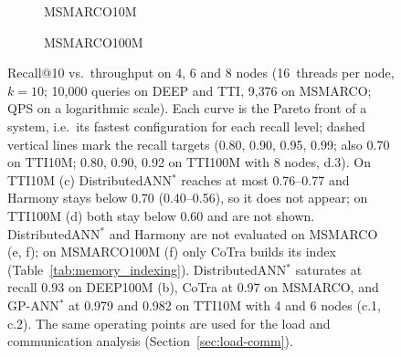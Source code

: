 \begin{figure}[t]
\begin{subfigure}[t]{0.495\textwidth}
  \hfill{}\hfill{}
  \caption{MSMARCO10M}\label{fig:curve-msmarco10m}
\end{subfigure}\hfill
\begin{subfigure}[t]{0.495\textwidth}
  \hfill{}\hfill{}
  \caption{MSMARCO100M}\label{fig:curve-msmarco100m}
\end{subfigure}
\caption{Recall@10 vs.\ throughput on 4, 6 and 8 nodes (16~threads per node, $k{=}10$;
10{,}000 queries on DEEP and TTI, 9{,}376 on MSMARCO; QPS on a logarithmic scale). Each
curve is the Pareto front of a system, i.e.\ its fastest configuration for each recall
level; dashed vertical lines mark the recall targets (0.80, 0.90, 0.95, 0.99; also 0.70 on
TTI10M; 0.80, 0.90, 0.92 on TTI100M with 8 nodes, d.3). On TTI10M (c) DistributedANN$^*$
reaches at most 0.76--0.77 and Harmony stays below 0.70 (0.40--0.56), so it does not appear;
on TTI100M (d) both stay below 0.60 and are not shown. DistributedANN$^*$ and Harmony are
not evaluated on MSMARCO (e, f); on MSMARCO100M (f) only CoTra builds its index
(Table~\ref{tab:memory_indexing}). DistributedANN$^*$ saturates at recall 0.93 on DEEP100M (b),
CoTra at 0.97 on MSMARCO, and GP-ANN$^*$ at 0.979 and 0.982 on TTI10M with 4 and 6 nodes
(c.1, c.2). The same operating points are used for the load and communication analysis
(Section~\ref{sec:load-comm}).}
\label{fig:curves}
\end{figure}
